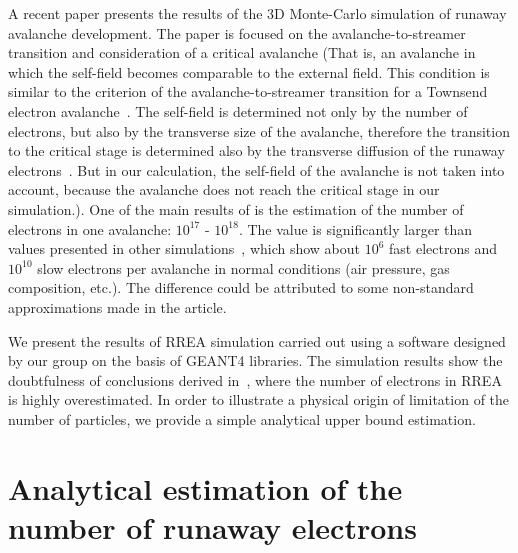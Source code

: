 \documentclass[doublecol,linenumbers]{epl2} %
\begin{document}
    A recent paper \cite{Oreshkin_2018} presents the results of the 3D Monte-Carlo simulation of runaway avalanche development. The paper is focused on the avalanche-to-streamer transition and consideration of a critical avalanche (That is, an avalanche in which the self-field becomes comparable to the external field. This condition is similar to the criterion of the avalanche-to-streamer transition for a Townsend electron avalanche~\cite{Meek1940}. The self-field is determined not only by the number of electrons, but also by the transverse size of the avalanche, therefore the transition to the critical stage is determined also by the transverse diffusion of the runaway electrons~\cite{Dwyer2010}. But in our calculation, the self-field of the avalanche is not taken into account, because the avalanche does not reach the critical stage in our simulation.). One of the main results of \cite{Oreshkin_2018} is the estimation of the number of electrons in one avalanche: $10^{17}$ - $10^{18}$. The value is significantly larger than values presented in other simulations~\cite{Gurevich:2001, dwyer2003fundamental,dwyer2011low}, which show about $10^6$ fast electrons and $10^{10}$ slow electrons per avalanche in normal conditions (air pressure, gas composition, etc.). The difference could be attributed to some non-standard approximations made in the article.
    
    We present the results of RREA simulation carried out using a software designed by our group on the basis of GEANT4 libraries. The simulation results show the doubtfulness of conclusions derived in~\cite{Oreshkin_2018}, where the number of electrons in RREA is highly overestimated. In order to illustrate a physical origin of limitation of the number of particles, we provide a simple analytical upper bound estimation.
    
    \section{Analytical estimation of the number of runaway electrons}
    
\end{document}
